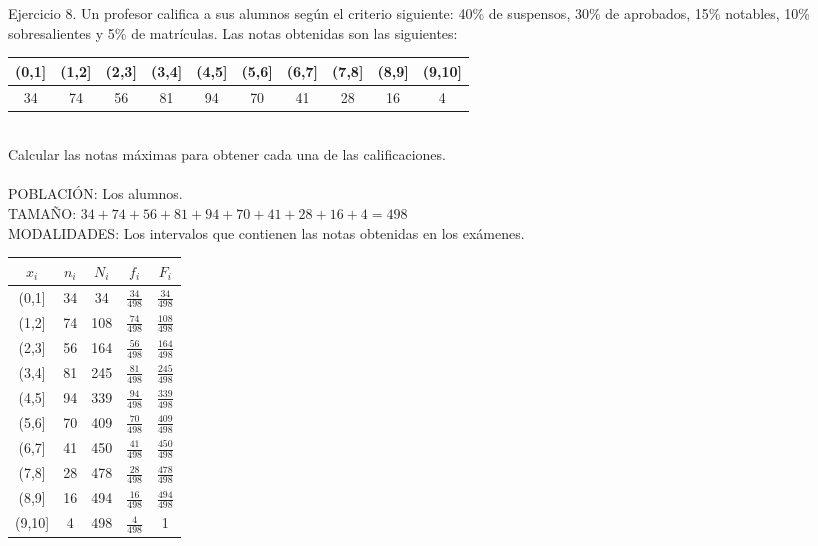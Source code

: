     Ejercicio 8. Un profesor califica a sus alumnos según el criterio siguiente: 40\% de suspensos, 30\% de aprobados, 15\% notables, 10\% sobresalientes y 5\% de matrículas. Las notas obtenidas son las siguientes: \\
    
    \begin{tabular}{| c | c | c | c | c | c | c | c | c | c |}
        \hline
        (0,1] & (1,2] & (2,3] & (3,4] & (4,5] & (5,6] & (6,7] & (7,8] & (8,9] & (9,10] \\ \hline
        34 & 74 & 56 & 81 & 94 & 70 & 41 & 28 & 16 & 4 \\ \hline
    \end{tabular} \\
    
    Calcular las notas máximas para obtener cada una de las calificaciones. 
    \\
    \\
    POBLACIÓN: Los alumnos. \\
    TAMAÑO: $34+74+56+81+94+70+41+28+16+4=498$ \\
    MODALIDADES: Los intervalos que contienen las notas obtenidas en los exámenes. \\
    
    \begin{center}
    \begin{tabular}{| c | c | c | c | c |}
        \hline
        $x_i$ & $n_i$ & $N_i$ & $f_i$ & $F_i$ \\ \hline
        (0,1] & 34 & 34 & $\frac{34}{498}$ & $\frac{34}{498}$ \\
        (1,2] & 74 & 108 & $\frac{74}{498}$ & $\frac{108}{498}$ \\
        (2,3] & 56 & 164 & $\frac{56}{498}$ & $\frac{164}{498}$ \\
        (3,4] & 81 & 245 & $\frac{81}{498}$ & $\frac{245}{498}$ \\
        (4,5] & 94 & 339 & $\frac{94}{498}$ & $\frac{339}{498}$ \\
        (5,6] & 70 & 409 & $\frac{70}{498}$ & $\frac{409}{498}$\\
        (6,7] & 41 & 450 & $\frac{41}{498}$ & $\frac{450}{498}$\\
        (7,8] & 28 & 478 & $\frac{28}{498}$ & $\frac{478}{498}$\\
        (8,9] & 16 & 494 & $\frac{16}{498}$ & $\frac{494}{498}$\\
        (9,10] & 4 & 498 & $\frac{4}{498}$ & 1 \\ \hline
    \end{tabular}
    \end{center}
    
